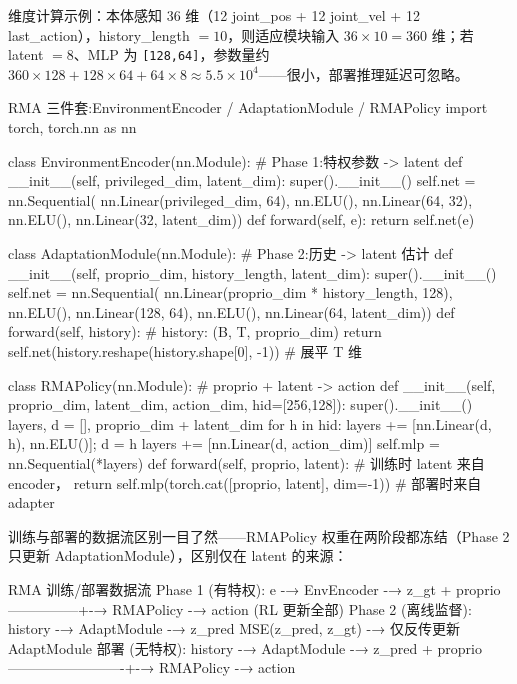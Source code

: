 维度计算示例：本体感知 36 维（12 joint\_pos + 12 joint\_vel + 12 last\_action），history\_length $=10$，则适应模块输入 $36\times10=360$ 维；若 latent $=8$、MLP 为 \verb|[128,64]|，参数量约 $360{\times}128+128{\times}64+64{\times}8\approx 5.5\times10^4$——很小，部署推理延迟可忽略。

\begin{codebox}[Python]{RMA 三件套:EnvironmentEncoder / AdaptationModule / RMAPolicy}
import torch, torch.nn as nn

class EnvironmentEncoder(nn.Module):           # Phase 1:特权参数 -> latent
    def __init__(self, privileged_dim, latent_dim):
        super().__init__()
        self.net = nn.Sequential(
            nn.Linear(privileged_dim, 64), nn.ELU(),
            nn.Linear(64, 32), nn.ELU(), nn.Linear(32, latent_dim))
    def forward(self, e): return self.net(e)

class AdaptationModule(nn.Module):             # Phase 2:历史 -> latent 估计
    def __init__(self, proprio_dim, history_length, latent_dim):
        super().__init__()
        self.net = nn.Sequential(
            nn.Linear(proprio_dim * history_length, 128), nn.ELU(),
            nn.Linear(128, 64), nn.ELU(), nn.Linear(64, latent_dim))
    def forward(self, history):                # history: (B, T, proprio_dim)
        return self.net(history.reshape(history.shape[0], -1))  # 展平 T 维

class RMAPolicy(nn.Module):                    # proprio + latent -> action
    def __init__(self, proprio_dim, latent_dim, action_dim, hid=[256,128]):
        super().__init__()
        layers, d = [], proprio_dim + latent_dim
        for h in hid: layers += [nn.Linear(d, h), nn.ELU()]; d = h
        layers += [nn.Linear(d, action_dim)]
        self.mlp = nn.Sequential(*layers)
    def forward(self, proprio, latent):        # 训练时 latent 来自 encoder，
        return self.mlp(torch.cat([proprio, latent], dim=-1))  # 部署时来自 adapter
\end{codebox}

训练与部署的数据流区别一目了然——RMAPolicy 权重在两阶段都冻结（Phase 2 只更新 AdaptationModule），区别仅在 latent 的来源：

\begin{codebox}[text]{RMA 训练/部署数据流}
Phase 1 (有特权):  e -→ EnvEncoder -→ z_gt +
                   proprio ---------------+-→ RMAPolicy -→ action  (RL 更新全部)
Phase 2 (离线监督): history -→ AdaptModule -→ z_pred
                   MSE(z_pred, z_gt) -→ 仅反传更新 AdaptModule
部署 (无特权):     history -→ AdaptModule -→ z_pred +
                   proprio -------------------------+-→ RMAPolicy -→ action
\end{codebox}

